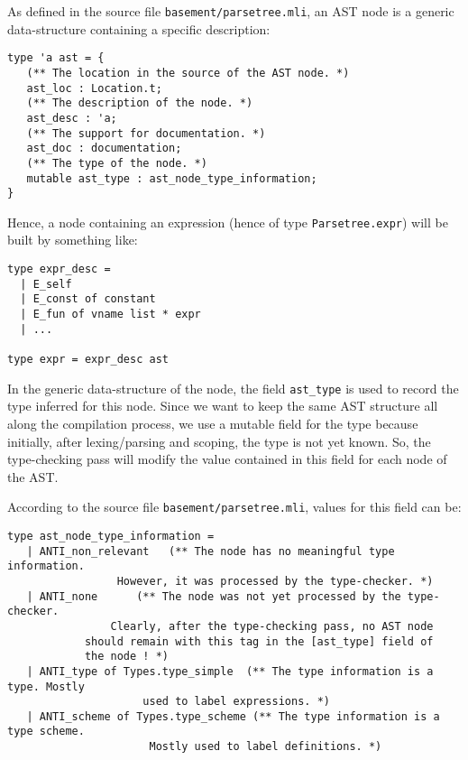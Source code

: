 As defined in the source file {\tt basement/parsetree.mli}, an AST
node is a generic data-structure containing a specific description:

{\footnotesize
\begin{lstlisting}[language=MyOCaml, title=Generic AST node]
type 'a ast = {
   (** The location in the source of the AST node. *)
   ast_loc : Location.t;
   (** The description of the node. *)
   ast_desc : 'a;
   (** The support for documentation. *)
   ast_doc : documentation;
   (** The type of the node. *)
   mutable ast_type : ast_node_type_information;
}
\end{lstlisting}
}
Hence, a node containing an expression (hence of type
{\tt Parsetree.expr}) will be built by something like:

{\footnotesize
\begin{lstlisting}[language=MyOCaml, title=An ``expression'' AST node]
type expr_desc =
  | E_self
  | E_const of constant
  | E_fun of vname list * expr
  | ...

type expr = expr_desc ast
\end{lstlisting}
}

In the generic data-structure of the node, the field
{\tt ast\_type} is used to record the type inferred for this
node. Since we want to keep the same AST structure all along the
compilation process, we use a mutable field for the type because
initially, after lexing/parsing and scoping, the type is not yet
known. So, the type-checking pass will modify the value contained in
this field for each node of the AST.

According to the source file {\tt basement/parsetree.mli}, values for
this field can be:

{\footnotesize
\begin{lstlisting}[language=MyOCaml, title=An ``expression'' AST node]
type ast_node_type_information =
   | ANTI_non_relevant   (** The node has no meaningful type information.
			     However, it was processed by the type-checker. *)
   | ANTI_none      (** The node was not yet processed by the type-checker.
		        Clearly, after the type-checking pass, no AST node
			should remain with this tag in the [ast_type] field of
			the node ! *)
   | ANTI_type of Types.type_simple  (** The type information is a type. Mostly
					 used to label expressions. *)
   | ANTI_scheme of Types.type_scheme (** The type information is a type scheme.
					  Mostly used to label definitions. *)
\end{lstlisting}
}

